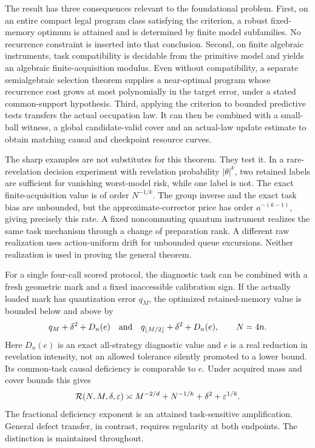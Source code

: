 The result has three consequences relevant to the foundational problem. First, on an entire compact legal program class satisfying the criterion, a robust fixed-memory optimum is attained and is determined by finite model subfamilies. No recurrence constraint is inserted into that conclusion. Second, on finite algebraic instruments, task compatibility is decidable from the primitive model and yields an algebraic finite-acquisition modulus. Even without compatibility, a separate semialgebraic selection theorem supplies a near-optimal program whose recurrence cost grows at most polynomially in the target error, under a stated common-support hypothesis. Third, applying the criterion to bounded predictive tests transfers the actual occupation law. It can then be combined with a small-ball witness, a global candidate-valid cover and an actual-law update estimate to obtain matching causal and checkpoint resource curves.

The sharp examples are not substitutes for this theorem. They test it. In a rare-revelation decision experiment with revelation probability $|\theta|^k$, two retained labels are sufficient for vanishing worst-model risk, while one label is not. The exact finite-acquisition value is of order $N^{-1/k}$. The group inverse and the exact task bias are unbounded, but the approximate-corrector price has order $a^{-(k-1)}$, giving precisely this rate. A fixed noncommuting quantum instrument realizes the same task mechanism through a change of preparation rank. A different raw realization uses action-uniform drift for unbounded queue excursions. Neither realization is used in proving the general theorem.

For a single four-call scored protocol, the diagnostic task can be combined with a fresh geometric mark and a fixed inaccessible calibration sign. If the actually loaded mark has quantization error $q_M$, the optimized retained-memory value is bounded below and above by
\begin{equation}\label{eq:intro-law}
 q_M+\delta^2+D_n(e)
 \quad\hbox{and}\quad
 q_{\lfloor M/2\rfloor}+\delta^2+D_n(e),\qquad N=4n.
\end{equation}
Here $D_n(e)$ is an exact all-strategy diagnostic value and $e$ is a real reduction in revelation intensity, not an allowed tolerance silently promoted to a lower bound. Its common-task causal deficiency is comparable to $e$. Under acquired mass and cover bounds this gives
\[
 \mathcal R(N,M,\delta,\varepsilon)
 \asymp M^{-2/d}+N^{-1/k}+\delta^2+\varepsilon^{1/k}.
\]
The fractional deficiency exponent is an attained task-sensitive amplification. General defect transfer, in contrast, requires regularity at both endpoints. The distinction is maintained throughout.

